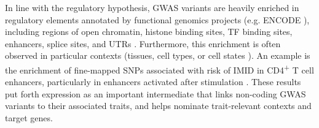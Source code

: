 In line with the regulatory hypothesis, \gls{GWAS} variants are heavily enriched in regulatory elements annotated by functional genomics projects (e.g. ENCODE \autocite{theencodeprojectconsortium2012IntegratedEncyclopediaDNA}), including
    regions of open chromatin, 
    histone binding sites, 
    \gls{TF} binding sites,
    enhancers,
    splice sites,
    and \glspl{UTR}
    \autocite{schaub2012LinkingDiseaseAssociations,maurano2012SystematicLocalizationCommon,farh2015GeneticEpigeneticFine,trynka2015DisentanglingEffectsColocalizing,nasser2020GenomewideMapsEnhancer}.
Furthermore, this enrichment is often observed in particular contexts (tissues, cell types, or cell states \autocite{visscher201710YearsGWAS,gallagher2018PostGWASEraAssociation,cano-gamez2020GWASFunctionUsing}).
An example is the enrichment of fine-mapped \glspl{SNP} associated with risk of \gls{IMID} in CD4\textsuperscript{+} T cell enhancers, particularly in enhancers activated after stimulation \autocite{farh2015GeneticEpigeneticFine}.
These results put forth expression as an important intermediate that links non-coding \gls{GWAS} variants to their associated traits, 
and helps nominate trait-relevant contexts and target genes.

